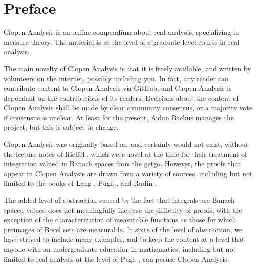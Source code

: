 \chapter*{Preface}
Clopen Analysis is an online compendium about real analysis, specializing in measure theory.
The material is at the level of a graduate-level course in real analysis.

The main novelty of Clopen Analysis is that it is freely available, and written by volunteers on the internet, possibly including you.
In fact, any reader can contribute content to Clopen Analysis via GitHub, and Clopen Analysis is dependent on the contributions of its readers.
Decisions about the content of Clopen Analysis shall be made by clear community consensus, or a majority vote if consensus is unclear.
At least for the present, Aidan Backus manages the project, but this is subject to change.

Clopen Analysis was originally based on, and certainly would not exist, without the lecture notes of Rieffel \cite{Rieffel1970}, which were novel at the time for their treatment of integration valued in Banach spaces from the getgo.
However, the proofs that appear in Clopen Analysis are drawn from a variety of sources, including but not limited to the books of Lang \cite{lang2012real}, Pugh \cite{pugh2013real}, and Rudin \cite{rudin1978real}.

The added level of abstraction caused by the fact that integrals are Banach-spaced valued does not meaningfully increase the difficulty of proofs, with the exception of the characterization of measurable functions as those for which preimages of Borel sets are measurable.
In spite of the level of abstraction, we have strived to include many examples, and to keep the content at a level that anyone with an undergraduate education in mathematics, including but not limited to real analysis at the level of Pugh \cite{pugh2013real}, can peruse Clopen Analysis.
